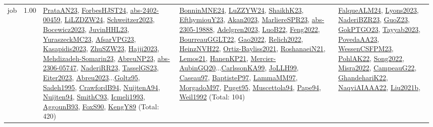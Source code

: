 {\begin{longtable}{p{3cm}r>{\raggedright\arraybackslash}p{6cm}>{\raggedright\arraybackslash}p{6cm}>{\raggedright\arraybackslash}p{8cm}}
\index{job}\index{Scheduling!job}job &  1.00 & \hyperref[detail:PrataAN23]{PrataAN23}, \hyperref[detail:ForbesHJST24]{ForbesHJST24}, \hyperref[detail:abs-2402-00459]{abs-2402-00459}, \hyperref[detail:LiLZDZW24]{LiLZDZW24}, \hyperref[detail:Schweitzer2023]{Schweitzer2023}, \hyperref[detail:Bocewicz2023]{Bocewicz2023}, \hyperref[detail:JuvinHHL23]{JuvinHHL23}, \hyperref[detail:YuraszeckMC23]{YuraszeckMC23}, \hyperref[detail:AfsarVPG23]{AfsarVPG23}, \hyperref[detail:Kasapidis2023]{Kasapidis2023}, \hyperref[detail:ZhuSZW23]{ZhuSZW23}, \hyperref[detail:Hajji2023]{Hajji2023}, \hyperref[detail:Mehdizadeh-Somarin23]{Mehdizadeh-Somarin23}, \hyperref[detail:AbreuNP23]{AbreuNP23}, \hyperref[detail:abs-2306-05747]{abs-2306-05747}, \hyperref[detail:NaderiRR23]{NaderiRR23}, \hyperref[detail:TasselGS23]{TasselGS23}, \hyperref[detail:Eiter2023]{Eiter2023}, \hyperref[detail:Abreu2023]{Abreu2023}...\hyperref[detail:Goltz95]{Goltz95}, \hyperref[detail:Sadeh1995]{Sadeh1995}, \hyperref[detail:CrawfordB94]{CrawfordB94}, \hyperref[detail:NuijtenA94]{NuijtenA94}, \hyperref[detail:Nuijten94]{Nuijten94}, \hyperref[detail:SmithC93]{SmithC93}, \hyperref[detail:Icmeli1993]{Icmeli1993}, \hyperref[detail:AggounB93]{AggounB93}, \hyperref[detail:FoxS90]{FoxS90}, \hyperref[detail:KengY89]{KengY89} (Total: 420) & \hyperref[detail:BonninMNE24]{BonninMNE24}, \hyperref[detail:LuZZYW24]{LuZZYW24}, \hyperref[detail:ShaikhK23]{ShaikhK23}, \hyperref[detail:EfthymiouY23]{EfthymiouY23}, \hyperref[detail:Akan2023]{Akan2023}, \hyperref[detail:MarliereSPR23]{MarliereSPR23}, \hyperref[detail:abs-2305-19888]{abs-2305-19888}, \hyperref[detail:Adelgren2023]{Adelgren2023}, \hyperref[detail:LuoB22]{LuoB22}, \hyperref[detail:Feng2022]{Feng2022}, \hyperref[detail:BourreauGGLT22]{BourreauGGLT22}, \hyperref[detail:Gao2022]{Gao2022}, \hyperref[detail:Relich2022]{Relich2022}, \hyperref[detail:HeinzNVH22]{HeinzNVH22}, \hyperref[detail:Ortiz-Bayliss2021]{Ortiz-Bayliss2021}, \hyperref[detail:RoshanaeiN21]{RoshanaeiN21}, \hyperref[detail:Lemos21]{Lemos21}, \hyperref[detail:HanenKP21]{HanenKP21}, \hyperref[detail:Mercier-AubinGQ20]{Mercier-AubinGQ20}...\hyperref[detail:CarlssonKA99]{CarlssonKA99}, \hyperref[detail:JoLLH99]{JoLLH99}, \hyperref[detail:Caseau97]{Caseau97}, \hyperref[detail:BaptisteP97]{BaptisteP97}, \hyperref[detail:LammaMM97]{LammaMM97}, \hyperref[detail:MorgadoM97]{MorgadoM97}, \hyperref[detail:Puget95]{Puget95}, \hyperref[detail:Muscettola94]{Muscettola94}, \hyperref[detail:Pape94]{Pape94}, \hyperref[detail:Weil1992]{Weil1992} (Total: 104) & \hyperref[detail:FalqueALM24]{FalqueALM24}, \hyperref[detail:Lyons2023]{Lyons2023}, \hyperref[detail:NaderiBZR23]{NaderiBZR23}, \hyperref[detail:GuoZ23]{GuoZ23}, \hyperref[detail:GokPTGO23]{GokPTGO23}, \hyperref[detail:Tayyab2023]{Tayyab2023}, \hyperref[detail:PovedaAA23]{PovedaAA23}, \hyperref[detail:WessenCSFPM23]{WessenCSFPM23}, \hyperref[detail:PohlAK22]{PohlAK22}, \hyperref[detail:Song2022]{Song2022}, \hyperref[detail:Misra2022]{Misra2022}, \hyperref[detail:CampeauG22]{CampeauG22}, \hyperref[detail:GhandehariK22]{GhandehariK22}, \hyperref[detail:NaqviAIAAA22]{NaqviAIAAA22}, \hyperref[detail:Liu2021b]{Liu2021b}, 
\end{longtable}}
